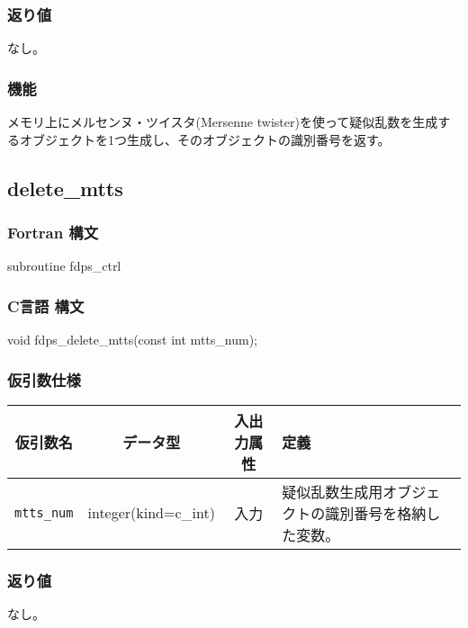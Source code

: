 \subsubsection*{返り値}
なし。

\subsubsection*{機能}
メモリ上にメルセンヌ・ツイスタ(Mersenne twister)を使って疑似乱数を生成するオブジェクトを1つ生成し、そのオブジェクトの識別番号を返す。
\clearpage

\subsection{delete\_mtts}
\subsubsection*{Fortran 構文}
\begin{screen}
\begin{spverbatim}
subroutine fdps_ctrl%
\end{spverbatim}
\end{screen}

\subsubsection*{C言語 構文}
\begin{screen}
\begin{spverbatim}
void fdps_delete_mtts(const int mtts_num);
\end{spverbatim}
\end{screen}

\subsubsection*{仮引数仕様}
\begin{table}[h]
\begin{tabularx}{\linewidth}{cccX}
\toprule
\rowcolor{Snow2}
仮引数名 & データ型 & 入出力属性 & 定義 \\
\midrule
\verb|mtts_num| & integer(kind=c\_int) & 入力 & 疑似乱数生成用オブジェクトの識別番号を格納した変数。\\
\bottomrule
\end{tabularx}
\end{table}

\subsubsection*{返り値}
なし。

